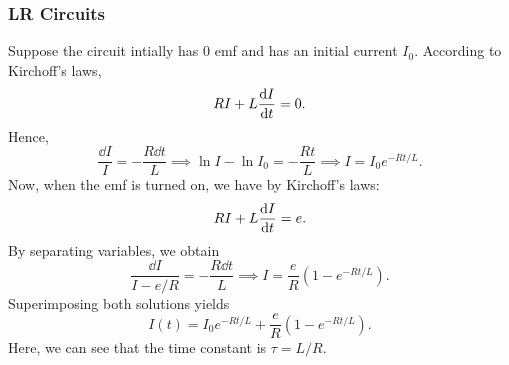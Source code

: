\documentclass[12pt]{article}
\begin{document}
\subsubsection{LR Circuits}
Suppose the circuit intially has $0$ emf and has an initial current $I_0$. According to Kirchoff's laws, 
\[RI + L \dv{I}{t} = 0.\]
Hence, 
\[\frac{\dd I}{I} = -\frac{R\dd t}{L}\implies \ln I - \ln I_0 = -\frac{Rt}{L}\implies I = I_0 e^{-Rt/L}.\]
Now, when the emf is turned on, we have by Kirchoff's laws:
\[RI + L \dv{I}{t} = e.\]
By separating variables, we obtain 
\[\frac{\dd I}{I - e/R} = - \frac{R\dd t}{L}\implies I = \frac{e}{R}(1 - e^{-Rt/L}).\]
Superimposing both solutions yields
\[I(t) = I_0 e^{-Rt/L} + \frac{e}{R} (1 - e^{-Rt/L}).\]
Here, we can see that the time constant is $\tau = L/R.$
\end{document}
